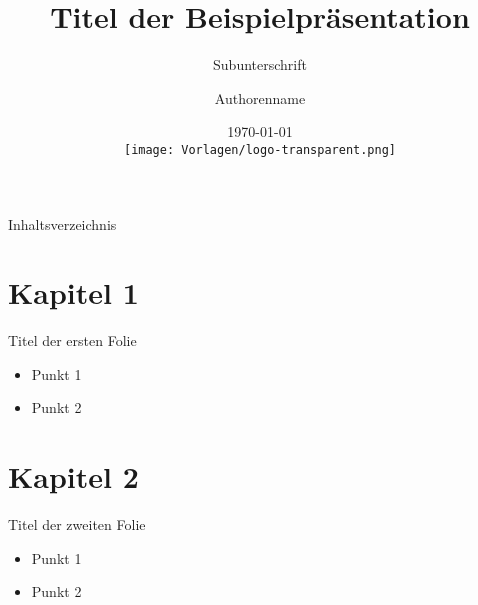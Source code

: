 \documentclass{beamer}
\begin{document}
\title[Kurzform des Titels]{Titel der Beispielpräsentation}
\subtitle[Kurzform Subunterschrift]{Subunterschrift}
\author[Kurzform des Namens]{Authorenname}
\date{\today\\\vspace{0.5cm} \texttt{[image: Vorlagen/logo-transparent.png]}}

\begin{frame}
\titlepage	
\end{frame}
\begin{frame}{Inhaltsverzeichnis}
	\tableofcontents
\end{frame}
\section{Kapitel 1}
\begin{frame}{Titel der ersten Folie}
\begin{itemize}
	\item Punkt 1
	\item Punkt 2
\end{itemize}
\end{frame}
\section{Kapitel 2}
\begin{frame}{Titel der zweiten Folie}
	\begin{itemize}
		\item Punkt 1
		\item Punkt 2
	\end{itemize}
\end{frame}
\end{document}
